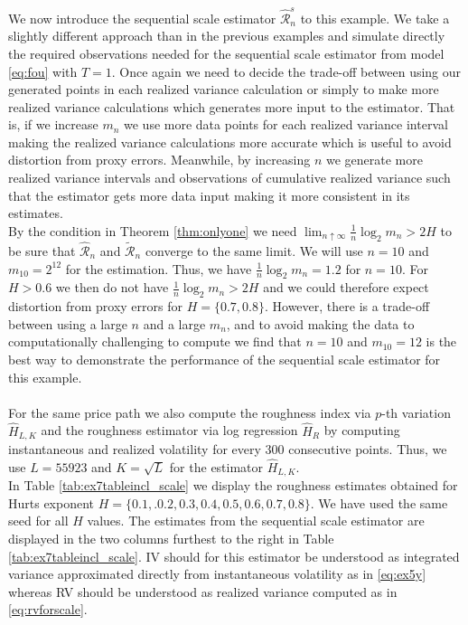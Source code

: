 \documentclass{article}
\begin{document}
We now introduce the sequential scale estimator $\widehat{\mathscr{R}}_n^s$ to this example. We take a slightly different approach than in the previous examples and simulate directly the required observations needed for the sequential scale estimator from model \eqref{eq:fou} with $T=1$. Once again we need to decide the trade-off between using our generated points in each realized variance calculation or simply to make more realized variance calculations which generates more input to the estimator. That is, if we increase $m_n$ we use more data points for each realized variance interval making the realized variance calculations more accurate which is useful to avoid distortion from proxy errors. Meanwhile, by increasing $n$ we generate more realized variance intervals and observations of cumulative realized variance such that the estimator gets more data input making it more consistent in its estimates.\\
By the condition in Theorem \ref{thm:onlyone} we need $\lim_{n\uparrow \infty} \frac{1}{n}\log_2 m_n >2H$ to be sure that $\widehat{\mathscr{R}}_n$ and $\widetilde{\mathscr{R}}_n$ converge to the same limit. We will use $n=10$ and $m_{10} = 2^{12}$ for the estimation. Thus, we have $\frac{1}{n}\log_2 m_n=1.2$ for $n=10$. For $H>0.6$ we then do not have $\frac{1}{n}\log_2 m_n >2H$ and we could therefore expect distortion from proxy errors for $H=\{0.7,0.8\}$. However, there is a trade-off between using a large $n$ and a large $m_n$, and to avoid making the data to computationally challenging to compute we find that $n=10$ and $m_{10}=12$ is the best way to demonstrate the performance of the sequential scale estimator for this example.\\\\
For the same price path we also compute the roughness index via $p$-th variation $\widehat{H}_{L,K}$ and the roughness estimator via log regression $\widehat{H}_R$ by computing instantaneous and realized volatility for every 300 consecutive points. Thus, we use $L=55923$ and $K=\sqrt{L}$ for the estimator $\widehat{H}_{L,K}$.\\
In Table \ref{tab:ex7tableincl_scale} we display the roughness estimates obtained for Hurts exponent $H=\{0.1,.0.2,0.3,0.4,0.5,0.6,0.7,0.8\}$. We have used the same seed for all $H$ values. The estimates from the sequential scale estimator are displayed in the two columns furthest to the right in Table \ref{tab:ex7tableincl_scale}. IV should for this estimator be understood as integrated variance approximated directly from instantaneous volatility as in \eqref{eq:ex5y} whereas RV should be understood as realized variance computed as in \eqref{eq:rvforscale}.
\end{document}
